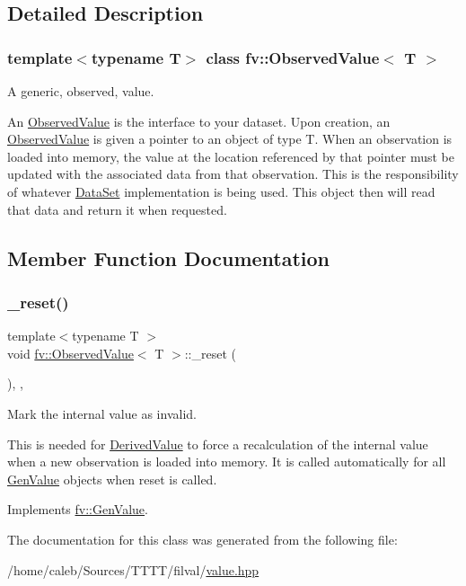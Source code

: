 \subsection{Detailed Description}
\subsubsection*{template$<$typename T$>$\newline
class fv\+::\+Observed\+Value$<$ T $>$}

A generic, observed, value. 

An \hyperlink{classfv_1_1ObservedValue}{Observed\+Value} is the interface to your dataset. Upon creation, an \hyperlink{classfv_1_1ObservedValue}{Observed\+Value} is given a pointer to an object of type T. When an observation is loaded into memory, the value at the location referenced by that pointer must be updated with the associated data from that observation. This is the responsibility of whatever \hyperlink{classfv_1_1DataSet}{Data\+Set} implementation is being used. This object then will read that data and return it when requested. 

\subsection{Member Function Documentation}
\hypertarget{classfv_1_1ObservedValue_af301f95c27cfa8024105a845ac6a7760}{}\label{classfv_1_1ObservedValue_af301f95c27cfa8024105a845ac6a7760} 
\subsubsection{\texorpdfstring{\+\_\+reset()}{\_reset()}}
{\footnotesize\ttfamily template$<$typename T $>$ \\
void \hyperlink{classfv_1_1ObservedValue}{fv\+::\+Observed\+Value}$<$ T $>$\+::\+\_\+reset (\begin{DoxyParamCaption}{ }\end{DoxyParamCaption})\hspace{0.3cm}{\ttfamily [inline]}, {\ttfamily [private]}, {\ttfamily [virtual]}}



Mark the internal value as invalid. 

This is needed for \hyperlink{classfv_1_1DerivedValue}{Derived\+Value} to force a recalculation of the internal value when a new observation is loaded into memory. It is called automatically for all \hyperlink{classfv_1_1GenValue}{Gen\+Value} objects when reset is called. 

Implements \hyperlink{classfv_1_1GenValue_a26160e53542b728f9e0c11495dce3c20}{fv\+::\+Gen\+Value}.



The documentation for this class was generated from the following file\+:\begin{DoxyCompactItemize}
\item 
/home/caleb/\+Sources/\+T\+T\+T\+T/filval/\hyperlink{value_8hpp}{value.\+hpp}\end{DoxyCompactItemize}
